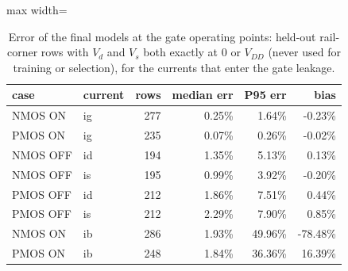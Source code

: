 \begin{table}[H]
\centering
{\small
\begin{adjustbox}{max width=\linewidth}
\begin{tabular}{llrrrr}
\toprule
case & current & rows & median err & P95 err & bias \\
\midrule
NMOS ON & ig & 277 & 0.25\% & 1.64\% & -0.23\% \\
PMOS ON & ig & 235 & 0.07\% & 0.26\% & -0.02\% \\
NMOS OFF & id & 194 & 1.35\% & 5.13\% & 0.13\% \\
NMOS OFF & is & 195 & 0.99\% & 3.92\% & -0.20\% \\
PMOS OFF & id & 212 & 1.86\% & 7.51\% & 0.44\% \\
PMOS OFF & is & 212 & 2.29\% & 7.90\% & 0.85\% \\
NMOS ON & ib & 286 & 1.93\% & 49.96\% & -78.48\% \\
PMOS ON & ib & 248 & 1.84\% & 36.36\% & 16.39\% \\
\bottomrule
\end{tabular}
\end{adjustbox}
}
\caption{Error of the final models at the gate operating points: held-out rail-corner rows with $V_d$ and $V_s$ both exactly at $0$ or $V_{DD}$ (never used for training or selection), for the currents that enter the gate leakage.}
\label{tab:rails}
\end{table}

